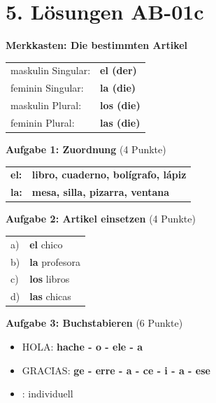 \documentclass[11pt, a4paper]{article}
\newcommand{\fachfarbe}{spanisch}
\newcommand{\sequenz}{01}
\newcommand{\block}{c}
\newcommand{\loesung}[1]{\textcolor{loesung}{\textbf{#1}}}
\newcommand{\es}[1]{\textcolor{\fachfarbe}{\textbf{#1}}}
\begin{document}
\section*{5. Lösungen AB-\sequenz\block}

\textbf{Merkkasten: Die bestimmten Artikel}

\begin{tabular}{ll}
maskulin Singular: & \loesung{el (der)} \\
feminin Singular: & \loesung{la (die)} \\
maskulin Plural: & \loesung{los (die)} \\
feminin Plural: & \loesung{las (die)} \\
\end{tabular}

\vspace{1em}

\textbf{Aufgabe 1: Zuordnung} (4 Punkte)

\begin{tabular}{ll}
\es{el:} & \loesung{libro, cuaderno, bolígrafo, lápiz} \\
\es{la:} & \loesung{mesa, silla, pizarra, ventana} \\
\end{tabular}

\vspace{1em}

\textbf{Aufgabe 2: Artikel einsetzen} (4 Punkte)

\begin{tabular}{ll}
a) & \loesung{el} chico \\
b) & \loesung{la} profesora \\
c) & \loesung{los} libros \\
d) & \loesung{las} chicas \\
\end{tabular}

\vspace{1em}

\textbf{Aufgabe 3: Buchstabieren} (6 Punkte)

\begin{itemize}
    \item HOLA: \loesung{hache - o - ele - a}
    \item GRACIAS: \loesung{ge - erre - a - ce - i - a - ese}
    \item [eigener Name]: individuell
\end{itemize}

\vspace{1em}
\end{document}
